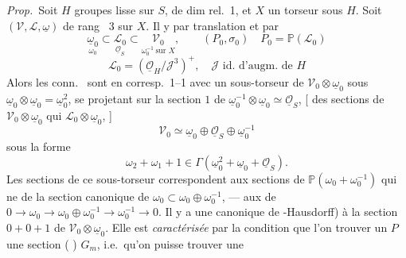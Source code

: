 \documentclass[11pt,a4paper]{article}
\begin{document}
\emph{Prop.}\ Soit $H$   groupes lisse sur $S$, de dim rel.~1, et $X$ un torseur sous $H$. Soit $(\mathcal{V}, \mathcal{L}, \underline{\omega})$  de rang ~3   sur $X$. Il y    par translation et   par
\[
\underset{\omega_0}{\underline{\omega}_0} \subset \underset{\underline{\mathcal{O}}_S}{\mathcal{L}_0} \subset \underset{\omega_0^{-1}\ \text{sur } X}{\mathcal{V}_0}, \qquad (P_0, \sigma_0) \quad P_0 = \mathbb{P}(\mathcal{L}_0)
\]
\[
\mathcal{L}_0 = (\underline{\mathcal{O}}_H/\mathcal{J}^{3})^{+}, \quad \mathcal{J} \text{ id.\ d'augm.\ de } H
\]
Alors les conn.\   sont en corresp.\ 1--1 avec un  sous-torseur \struck{\ill{}} de $\mathcal{V}_0 \otimes \underline{\omega}_0$ sous $\underline{\omega}_0 \otimes \underline{\omega}_0 = \underline{\omega}_0^{2}$, se projetant sur la section $1$ de $\underline{\omega}_0^{-1} \otimes \underline{\omega}_0 \simeq \underline{\mathcal{O}}_S$, [ des sections  \struck{\ill{}} de $\mathcal{V}_0 \otimes \underline{\omega}_0$ qui    $\mathcal{L}_0 \otimes \underline{\omega}_0$, ]   \struck{\ill{}}   
\[
\mathcal{V}_0 \simeq \underline{\omega}_0 \oplus \underline{\mathcal{O}}_S \oplus \underline{\omega}_0^{-1}
\]
\uncertain{\ill{}} \uncertain{\ill{}}  sous la forme
\[
\omega_2 + \omega_1 + 1 \in \Gamma(\underline{\omega}_0^{2} + \underline{\omega}_0 + \underline{\mathcal{O}}_S).
\]
Les sections de ce sous-torseur correspondent aux sections de $\mathbb{P}(\omega_0 + \omega_0^{-1})$ qui ne  \uncertain{\ill{}} de la section canonique  de $\omega_0 \subset \omega_0 \oplus \omega_0^{-1}$, — \uncertain{\ill{}} \uncertain{\ill{}} aux  de $0 \to \omega_0 \to \omega_0 \oplus \omega_0^{-1} \to \omega_0^{-1} \to 0$. Il y a  une canonique     de -Hausdorff)  à la section $0 + 0 + 1$ de $\mathcal{V}_0 \otimes \underline{\omega}_0$. Elle est \emph{caractérisée}   par la condition que \struck{\ill{}} l'on  trouver un $P$ une section  (   \ill{})  $G_m$, i.e.\ qu'on puisse trouver une
\end{document}
